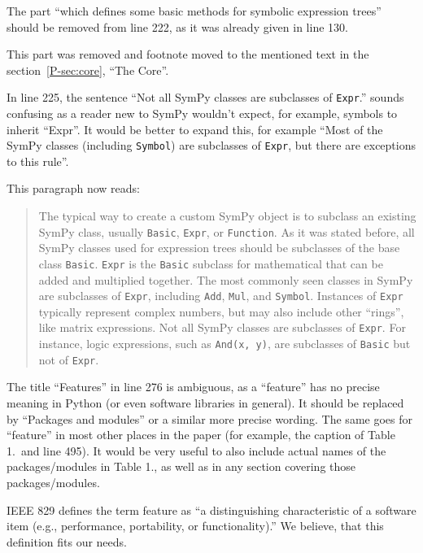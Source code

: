 \documentclass[answers,12pt]{exam}
\begin{document}
\begin{questions}
\question The part ``which defines some basic methods for symbolic expression trees'' should be removed from line 222, as it was already given in line 130.
\begin{solution}
This part was removed and footnote moved to the mentioned
text in the section~\ref{P-sec:core}, ``The Core''.
\end{solution}

\question In line 225, the sentence ``Not all SymPy classes are subclasses of \texttt{Expr}.'' sounds confusing as a reader new to SymPy wouldn't expect, for example, symbols to inherit ``Expr''. It would be better to expand this, for example ``Most of the SymPy classes (including \texttt{Symbol}) are subclasses of \texttt{Expr}, but there are exceptions to this rule''.
\begin{solution}
This paragraph now reads:
\begin{quote}
The typical way to create a custom SymPy object is to subclass an existing
SymPy class, usually \texttt{Basic}, \texttt{Expr}, or \texttt{Function}. As
it was stated before, all SymPy classes used for expression trees should be
subclasses of the base class \texttt{Basic}. \texttt{Expr} is the
\texttt{Basic} subclass for mathematical that can be added and multiplied
together. The most commonly seen classes in SymPy are subclasses of
\texttt{Expr}, including \texttt{Add}, \texttt{Mul}, and \texttt{Symbol}.
Instances of \texttt{Expr} typically represent complex numbers, but may also
include other ``rings'', like matrix expressions. Not all SymPy classes are
subclasses of \texttt{Expr}. For instance, logic expressions, such as
\verb|And(x, y)|, are subclasses of \texttt{Basic} but not of \texttt{Expr}.
\end{quote}
\end{solution}

\question The title ``Features'' in line 276 is ambiguous, as a ``feature''
has no precise meaning in Python (or even software libraries in general). It
should be replaced by ``Packages and modules'' or a similar more precise
wording. The same goes for ``feature'' in most other places in the paper (for
example, the caption of Table 1.\ and line 495). It would be very useful to also include actual names of the packages/modules in Table 1., as well as in any section covering those packages/modules.
\begin{solution}
IEEE 829 defines the term feature as ``a distinguishing
characteristic of a software item (e.g., performance, portability,
or functionality).''  We believe, that this definition fits our needs.


\end{solution}
\end{questions}
\end{document}
